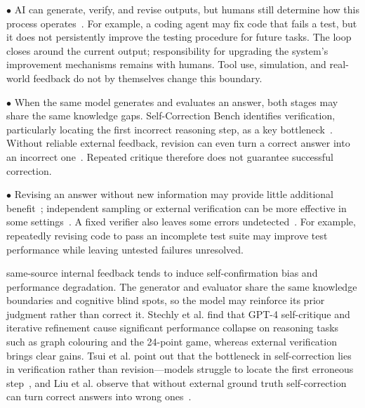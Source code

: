 \noindent$\bullet$  AI can generate, verify, and revise outputs, but humans still determine how this process operates~\cite{madaan2023self}. For example, a coding agent may fix code that fails a test, but it does not persistently improve the testing procedure for future tasks. The loop closes around the current output; responsibility for upgrading the system's improvement mechanisms remains with humans. Tool use, simulation, and real-world feedback do not by themselves change this boundary.



\noindent$\bullet$  When the same model generates and evaluates an answer, both stages may share the same knowledge gaps. Self-Correction Bench identifies verification, particularly locating the first incorrect reasoning step, as a key bottleneck~\cite{tsui2026selfcorrectionbenchuncoveringaddressing,tyen2024finderrors}. Without reliable external feedback, revision can even turn a correct answer into an incorrect one~\cite{huang2024cannotselfcorrect}. Repeated critique therefore does not guarantee successful correction.

\noindent$\bullet$ 
Revising an answer without new information may provide little additional benefit~\cite{li2026decomposing}; independent sampling or external verification can be more effective in some settings~\cite{olausson2024self,verma2026blindresampling}. A fixed verifier also leaves some errors undetected~\cite{liu2023evalplus}. For example, repeatedly revising code to pass an incomplete test suite may improve test performance while leaving untested failures unresolved.

\iffalse
same-source internal feedback tends to induce self-confirmation bias and performance degradation. The generator and evaluator share the same knowledge boundaries and cognitive blind spots, so the model may reinforce its prior judgment rather than correct it. Stechly et al. find that GPT-4 self-critique and iterative refinement cause significant performance collapse on reasoning tasks such as graph colouring and the 24-point game, whereas external verification brings clear gains. Tsui et al. point out that the bottleneck in self-correction lies in verification rather than revision---models struggle to locate the first erroneous step~\cite{tsui2026selfcorrectionbenchuncoveringaddressing}, and Liu et al. observe that without external ground truth self-correction can turn correct answers into wrong ones~\cite{liu2024intrinsicselfcorrection}.

